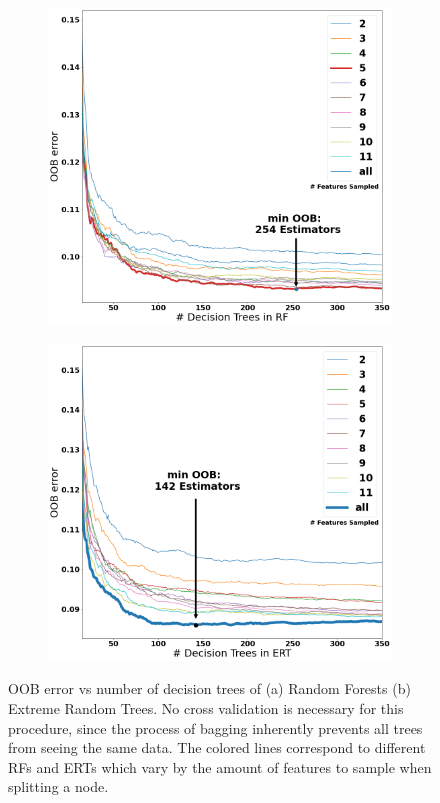 \documentclass[a4paper, twoside, final, 12pt]{article}
\begin{document}
{\begin{figure}
	\begin{subfigure}{0.48\linewidth}
		\centering
		\includegraphics[scale=0.2]{./src/RF_oob_error}
		\caption{}
		\label{subfig:rfoob}
	\end{subfigure}
	\begin{subfigure}{0.5\linewidth}
		\centering
		\includegraphics[scale=0.2]{./src/ERT_oob_error}
		\caption{}
		\label{subfig:rf_rmse}
	\end{subfigure}
	\caption{OOB error vs number of decision trees of (a) Random Forests (b) Extreme Random Trees. No cross validation is necessary for this procedure, since the process of bagging inherently prevents all trees from seeing the same data. The colored lines correspond to different RFs and ERTs which vary by the amount of features to sample when splitting a node. }
	\label{fig:RF_exp}
\end{figure}

}
\end{document}
